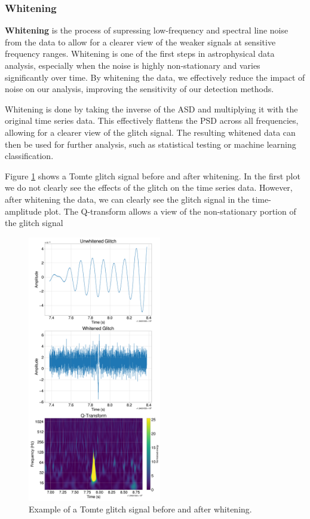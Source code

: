 \documentclass[12pt]{article}
\begin{document}
\subsubsection{Whitening}

\textbf{Whitening} is the process of supressing low-frequency and spectral line noise from the data to allow for a clearer view of the weaker signals at sensitive frequency ranges. Whitening is one of the first steps in astrophysical data analysis, especially when the noise is highly non-stationary and varies significantly over time. By whitening the data, we effectively reduce the impact of noise on our analysis, improving the sensitivity of our detection methods.

\medskip
\noindent Whitening is done by taking the inverse of the ASD and multiplying it with the original time series data. This effectively flattens the PSD across all frequencies, allowing for a clearer view of the glitch signal. The resulting whitened data can then be used for further analysis, such as statistical testing or machine learning classification.

\medskip
\noindent Figure \ref{fig:sampletomte} shows a Tomte glitch signal before and after whitening. In the first plot we do not clearly see the effects of the glitch on the time series data. However, after whitening the data, we can clearly see the glitch signal in the time-amplitude plot. The Q-transform allows a view of the non-stationary portion of the glitch signal

\begin{figure}[H]
  \centering
  \includegraphics[width=0.52\textwidth]{images/sample_plot.pdf}
  \caption{Example of a Tomte glitch signal before and after whitening.}
  \label{fig:sampletomte}
\end{figure}
\end{document}
